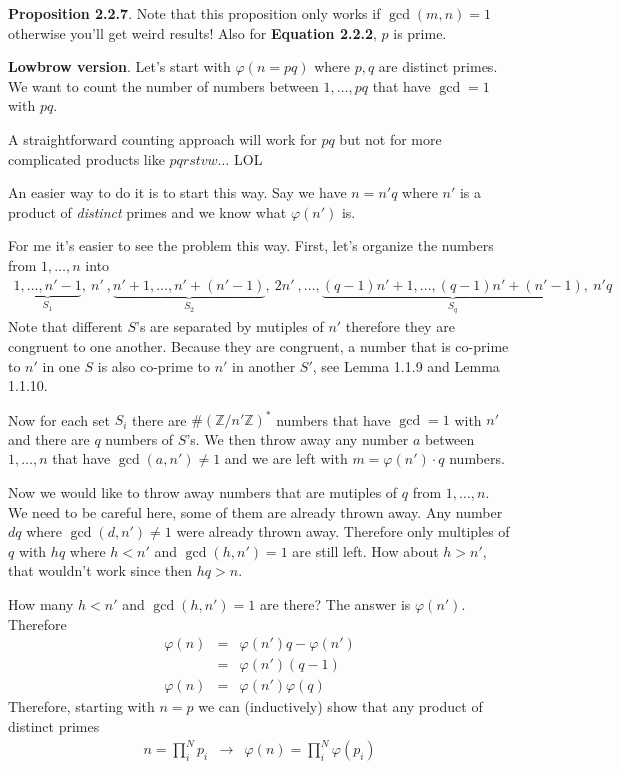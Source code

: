\documentclass[aps,preprint,preprintnumbers,nofootinbib,showpacs,prd]{revtex4-1}
\newcommand{\nbea}{\begin{eqnarray*}}
\newcommand{\neea}{\end{eqnarray*}}
\begin{document}
{\bf Proposition 2.2.7}. Note that this proposition only works if $\gcd(m,n) = 1$ otherwise you'll get weird results! Also for {\bf Equation 2.2.2}, $p$ is prime.

{\bf Lowbrow version}. Let's start with $\varphi(n=pq)$ where $p,q$ are distinct primes. We want to count the number of numbers between $1, \dots, pq$ that have $\gcd=1$ with $pq$.

A straightforward counting approach will work for $pq$ but not for more complicated products like $pqrstvw \dots$ LOL

An easier way to do it is to start this way. Say we have $n = n' q$ where $n'$ is a product of {\it distinct} primes and we know what $\varphi(n')$ is.

For me it's easier to see the problem this way. First, let's organize the numbers from $1, \dots, n$ into
%
\nbea
\underbrace{1, \dots, n'-1}_\text{$S_1$}, ~n'~, \underbrace{n'+1, \dots, n'+(n'-1)}_\text{$S_2$}, ~2n'~, \dots, \underbrace{(q-1)n' + 1, \dots, (q-1)n' + (n' - 1)}_\text{$S_q$}, ~n'q
\neea
%
Note that different $S$'s are separated by mutiples of $n'$ therefore they are congruent to one another. Because they are congruent, a number that is co-prime to $n'$ in one $S$ is also co-prime to $n'$ in another $S'$, see Lemma 1.1.9 and Lemma 1.1.10.

Now for each set $S_i$ there are $\#(\mathbb{Z}/n'\mathbb{Z})^*$ numbers that have $\gcd=1$ with $n'$ and there are $q$ numbers of $S$'s. We then throw away any number $a$ between $1, \dots, n$ that have $\gcd(a,n') \neq 1$ and we are left with $m = \varphi(n') \cdot q$ numbers.

Now we would like to throw away numbers that are mutiples of $q$ from $1, \dots, n$. We need to be careful here, some of them are already thrown away. Any number $dq$ where $\gcd(d,n') \neq 1$ were already thrown away. Therefore only multiples of $q$ with $hq$ where $h < n'$ and $\gcd(h,n')=1$ are still left. How about $h > n'$, that wouldn't work since then $hq > n$.

How many $h < n'$ and $\gcd(h,n')=1$ are there? The answer is $\varphi(n')$. Therefore
%
\nbea
\varphi(n) & = & \varphi(n')q - \varphi(n') \\
& = & \varphi(n')(q - 1) \\
\varphi(n) & = & \varphi(n') \varphi(q) 
\neea
%
Therefore, starting with $n = p$ we can (inductively) show that any product of distinct primes
%
\nbea
n = \prod_i^{N} p_i & \to & \varphi(n) = \prod_i^{N} \varphi(p_i)
\neea
%
\end{document}
